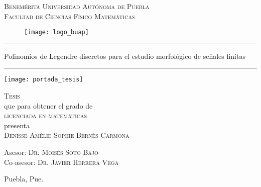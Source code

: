 

\begin{center}
{\Large{
\textsc{Benemérita Universidad Autónoma de Puebla}
}} \\
\vspace{0.5cm}
{\Large{
\textsc{Facultad de Ciencias Físico Matemáticas}
}}
\end{center}


\begin{figure}[H]
	\centering
	\texttt{[image: logo\_buap]} 
\end{figure}	





\hrule
\vspace{0.5cm}
\begin{center}
{\Large {Polinomios de Legendre discretos
para el estudio morfológico de señales finitas}}
\end{center}
\vspace{0.5cm}
\hrule


\begin{marginfigure}
\texttt{[image: portada\_tesis]} 
\end{marginfigure}



\vspace{4cm}

\noindent
\textsc{Tesis} \\
que para obtener el grado de \\
\textsc{licenciada en matemáticas} \\
presenta \\
\textsc{Denisse Amélie Sophie Bernès Carmona}

\vspace{2cm}

\noindent
Asesor: \textsc{Dr. Moisés Soto Bajo} \\
Co-asesor: \textsc{Dr. Javier Herrera Vega} 




\vspace*{\fill}
Puebla, Pue. 









\newpage
